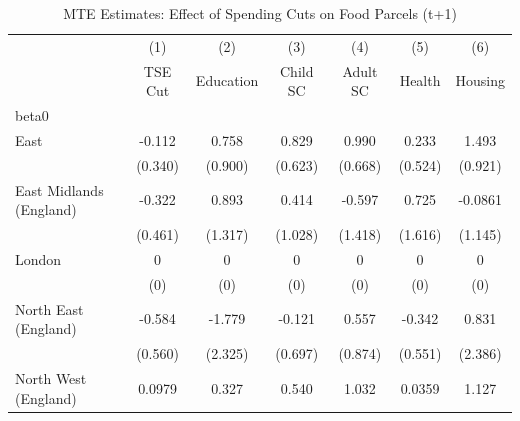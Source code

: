 \begin{table}[htbp]\centering
\def\sym#1{\ifmmode^{#1}\else\(^{#1}\)\fi}
\caption{MTE Estimates: Effect of Spending Cuts on Food Parcels (t+1)}
\begin{tabular}{l*{6}{c}}
\toprule
                    &\multicolumn{1}{c}{(1)}&\multicolumn{1}{c}{(2)}&\multicolumn{1}{c}{(3)}&\multicolumn{1}{c}{(4)}&\multicolumn{1}{c}{(5)}&\multicolumn{1}{c}{(6)}\\
                    &\multicolumn{1}{c}{TSE Cut}&\multicolumn{1}{c}{Education}&\multicolumn{1}{c}{Child SC}&\multicolumn{1}{c}{Adult SC}&\multicolumn{1}{c}{Health}&\multicolumn{1}{c}{Housing}\\
\midrule
beta0               &                     &                     &                     &                     &                     &                     \\
East                &      -0.112         &       0.758         &       0.829         &       0.990         &       0.233         &       1.493         \\
                    &     (0.340)         &     (0.900)         &     (0.623)         &     (0.668)         &     (0.524)         &     (0.921)         \\
\addlinespace
East Midlands (England)&      -0.322         &       0.893         &       0.414         &      -0.597         &       0.725         &     -0.0861         \\
                    &     (0.461)         &     (1.317)         &     (1.028)         &     (1.418)         &     (1.616)         &     (1.145)         \\
\addlinespace
London              &           0         &           0         &           0         &           0         &           0         &           0         \\
                    &         (0)         &         (0)         &         (0)         &         (0)         &         (0)         &         (0)         \\
\addlinespace
North East (England)&      -0.584         &      -1.779         &      -0.121         &       0.557         &      -0.342         &       0.831         \\
                    &     (0.560)         &     (2.325)         &     (0.697)         &     (0.874)         &     (0.551)         &     (2.386)         \\
\addlinespace
North West (England)&      0.0979         &       0.327         &       0.540         &       1.032         &      0.0359         &       1.127         \\

\end{tabular}
\end{table}
